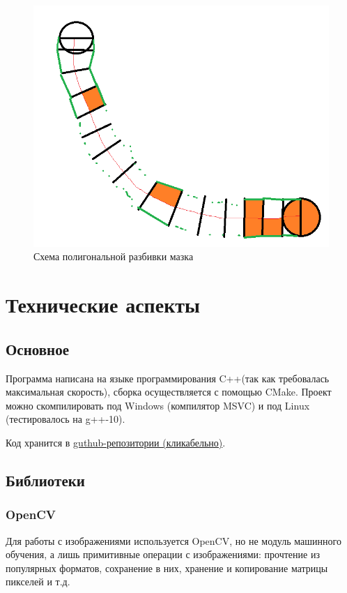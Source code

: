 \documentclass[11pt]{article}
\begin{document}
\begin{itemize}
        \begin{figure}
            \centering
            \includegraphics{polygonal_stroke.png}
            \caption{Схема полигональной разбивки мазка}
            \label{fig:polygonal_stroke}
        \end{figure}

    \end{itemize}

    \section{Технические аспекты}\label{sec:tecnical}

    \subsection{Основное}\label{subsec:major}
    Программа написана на языке программирования C++(так как требовалась максимальная скорость), сборка осуществляется с помощью CMake.
    Проект можно скомпилировать под Windows (компилятор MSVC) и под Linux (тестировалось на g++-10).

    Код хранится в \href{https://github.com/donRumata03/Painter}{guthub-репозитории (кликабельно)}.

    \subsection{Библиотеки}\label{subsec:libs}

    \subsubsection{OpenCV}
    Для работы с изображениями используется OpenCV, но не модуль машинного обучения, а лишь примитивные операции с изображениями:
    прочтение из популярных форматов, сохранение в них, хранение и копирование матрицы пикселей и т.д.
\end{document}
